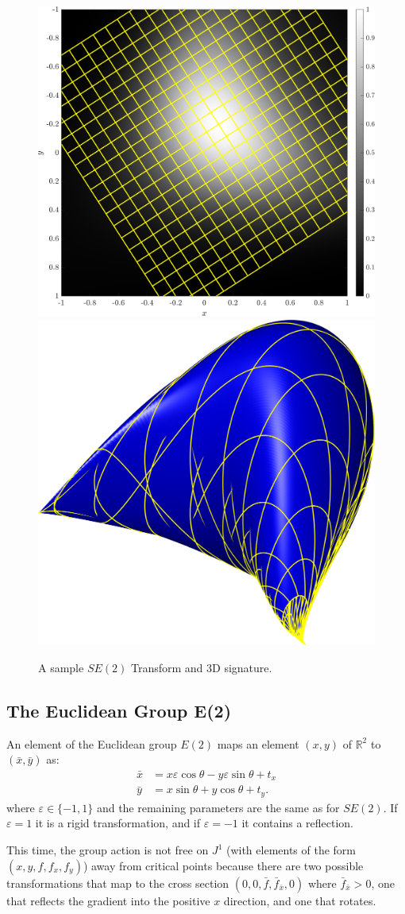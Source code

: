 \documentclass[review,onefignum,onetabnum]{siamonline190516}
\begin{document}
\begin{figure}
\centering
\includegraphics[width=.45\textwidth]{Figs/f_transformed_SE2.png}
\includegraphics[width=.45\textwidth]{Figs/SE2_signature.png}
\caption{A sample $SE(2)$ Transform and 3D signature.}
\label{fig:SE2}
\end{figure}

\subsection{The Euclidean Group E(2)}
An element of the Euclidean group $E(2)$ maps an element $(x, y)$ of
$\mathbb{R}^2$ to $(\bar{x}, \bar{y})$ as:
\begin{equation*}
  \begin{aligned}
    \bar{x} &=  x\varepsilon\cos\theta  - y\varepsilon\sin\theta + t_x \\
    \bar{y} &= x\sin\theta  + y\cos\theta + t_y.
  \end{aligned}
\end{equation*}
where $\varepsilon \in \{-1, 1\}$ and the remaining parameters are the same
as for $SE(2)$. If $\varepsilon = 1$ it is a rigid transformation, and if
$\varepsilon = -1$ it contains a reflection.

This time, the group action is not free on $J^1$ (with elements of the form
$(x, y, f, f_x, f_y)$) away from critical points because there are two
possible transformations that map to the cross section $(0, 0, \bar{f},
\bar{f}_{\bar{x}}, 0)$ where $\bar{f}_{\bar{x}} > 0$, one that reflects the
gradient into the positive $x$ direction, and one that rotates. 
\end{document}
